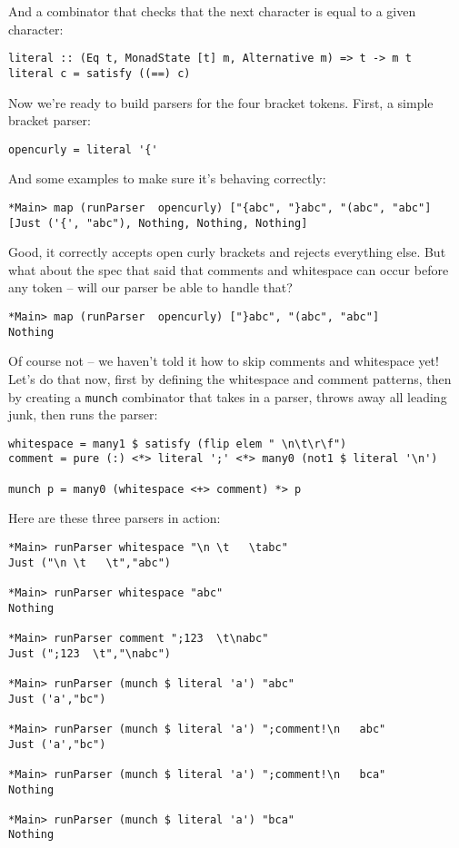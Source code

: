 \documentclass{tmr}
\begin{document}
And a combinator that checks that the next character is equal to a given character:
\begin{verbatim}
literal :: (Eq t, MonadState [t] m, Alternative m) => t -> m t
literal c = satisfy ((==) c)
\end{verbatim}

Now we're ready to build parsers for the four bracket tokens.  
First, a simple bracket parser:
\begin{verbatim}
opencurly = literal '{'
\end{verbatim}

And some examples to make sure it's behaving correctly:
\begin{verbatim}
*Main> map (runParser  opencurly) ["{abc", "}abc", "(abc", "abc"]
[Just ('{', "abc"), Nothing, Nothing, Nothing]
\end{verbatim}

Good, it correctly accepts open curly brackets and rejects everything else.
But what about the spec that said that comments and whitespace can occur 
before any token -- will our parser be able to handle that?
\begin{verbatim}
*Main> map (runParser  opencurly) ["}abc", "(abc", "abc"]
Nothing
\end{verbatim}

Of course not -- we haven't told it how to skip comments and whitespace yet!
Let's do that now, first by defining the whitespace and comment patterns, then
by creating a \verb+munch+ combinator that takes in a parser, 
throws away all leading junk, then runs the parser:
\begin{verbatim}
whitespace = many1 $ satisfy (flip elem " \n\t\r\f")
comment = pure (:) <*> literal ';' <*> many0 (not1 $ literal '\n')

munch p = many0 (whitespace <+> comment) *> p
\end{verbatim}
Here are these three parsers in action:
\begin{verbatim}
*Main> runParser whitespace "\n \t   \tabc"
Just ("\n \t   \t","abc")

*Main> runParser whitespace "abc"
Nothing

*Main> runParser comment ";123  \t\nabc"
Just (";123  \t","\nabc")

*Main> runParser (munch $ literal 'a') "abc"
Just ('a',"bc")

*Main> runParser (munch $ literal 'a') ";comment!\n   abc"
Just ('a',"bc")

*Main> runParser (munch $ literal 'a') ";comment!\n   bca"
Nothing

*Main> runParser (munch $ literal 'a') "bca"
Nothing
\end{verbatim}
\end{document}
